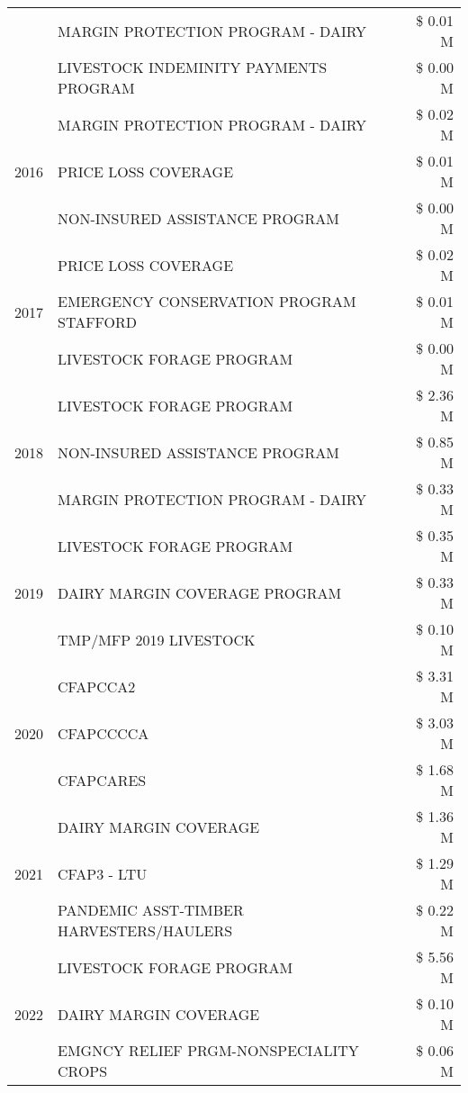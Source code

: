 \begin{tabular}{llr}
 & MARGIN PROTECTION PROGRAM - DAIRY & \$ 0.01 M \\
 & LIVESTOCK INDEMINITY PAYMENTS PROGRAM & \$ 0.00 M \\
\cline{1-3}
\multirow[t]{3}{*}{2016} & MARGIN PROTECTION PROGRAM - DAIRY & \$ 0.02 M \\
 & PRICE LOSS COVERAGE & \$ 0.01 M \\
 & NON-INSURED ASSISTANCE PROGRAM & \$ 0.00 M \\
\cline{1-3}
\multirow[t]{3}{*}{2017} & PRICE LOSS COVERAGE & \$ 0.02 M \\
 & EMERGENCY CONSERVATION PROGRAM STAFFORD & \$ 0.01 M \\
 & LIVESTOCK FORAGE PROGRAM & \$ 0.00 M \\
\cline{1-3}
\multirow[t]{3}{*}{2018} & LIVESTOCK FORAGE PROGRAM & \$ 2.36 M \\
 & NON-INSURED ASSISTANCE PROGRAM & \$ 0.85 M \\
 & MARGIN PROTECTION PROGRAM - DAIRY & \$ 0.33 M \\
\cline{1-3}
\multirow[t]{3}{*}{2019} & LIVESTOCK FORAGE PROGRAM & \$ 0.35 M \\
 & DAIRY MARGIN COVERAGE PROGRAM & \$ 0.33 M \\
 & TMP/MFP 2019 LIVESTOCK & \$ 0.10 M \\
\cline{1-3}
\multirow[t]{3}{*}{2020} & CFAPCCA2 & \$ 3.31 M \\
 & CFAPCCCCA & \$ 3.03 M \\
 & CFAPCARES & \$ 1.68 M \\
\cline{1-3}
\multirow[t]{3}{*}{2021} & DAIRY MARGIN COVERAGE & \$ 1.36 M \\
 & CFAP3 - LTU & \$ 1.29 M \\
 & PANDEMIC ASST-TIMBER HARVESTERS/HAULERS & \$ 0.22 M \\
\cline{1-3}
\multirow[t]{3}{*}{2022} & LIVESTOCK FORAGE PROGRAM & \$ 5.56 M \\
 & DAIRY MARGIN COVERAGE & \$ 0.10 M \\
 & EMGNCY RELIEF PRGM-NONSPECIALITY CROPS & \$ 0.06 M \\
\cline{1-3}
\bottomrule
\end{tabular}
